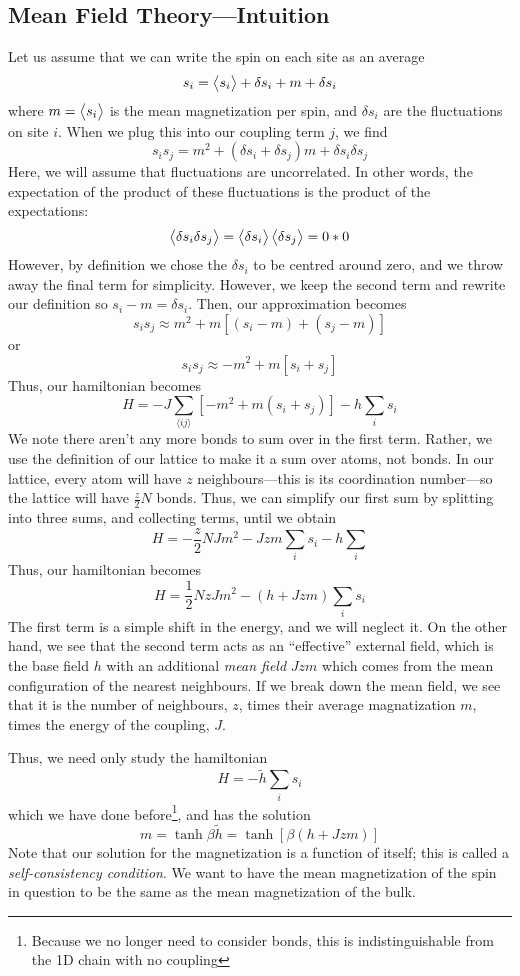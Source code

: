 \subsection{Mean Field Theory---Intuition}
Let us assume that we can write the spin on each site as an average
\[s_i = \left\langle \begin{matrix}s_i\end{matrix} \right\rangle+\delta s_i + m+\delta s_i\]
where \(m=\left\langle \begin{matrix}s_i\end{matrix} \right\rangle\) is the mean magnetization per spin, and \(\delta s_i\) are the fluctuations on site \(i\). When we plug this into our coupling term \(j\), we find
\[s_is_j = m^2 + (\delta s_i+\delta s_j)m + \delta s_i \delta s_j\]
Here, we will assume that fluctuations are uncorrelated. In other words, the expectation of the product of these fluctuations is the product of the expectations:
\[\left\langle \begin{matrix}\delta s_i\delta s_j\end{matrix} \right\rangle= \left\langle \begin{matrix}\delta s_i\end{matrix} \right\rangle\left\langle \begin{matrix}\delta s_j\end{matrix} \right\rangle = 0*0\]
However, by definition we chose the \(\delta s_i\) to be centred around zero, and we throw away the final term for simplicity. However, we keep the second term and rewrite our definition so \(s_i-m = \delta s_i\). Then, our approximation becomes
\[s_i s_j\approx m^2 + m[(s_i-m)+(s_j-m)]\]
or
\begin{equation}
	s_i s_j \approx -m^2+m[s_i+s_j]
\end{equation}
Thus, our hamiltonian becomes
\[H = -J\sum_{\langle i j \rangle}\left[-m^2+m(s_i+s_j)\right]-h\sum_i s_i\]
We note there aren't any more bonds to sum over in the first term. Rather, we use the definition of our lattice to make it a sum over atoms, not bonds. In our lattice, every atom will have \(z\) neighbours---this is its coordination number---so the lattice will have \(\frac{z}{2}N\) bonds. 
Thus, we can simplify our first sum by splitting into three sums, and collecting terms, until we obtain
\[H = -\frac{z}{2}NJ m^2-Jzm\sum_i s_i -h\sum_i\]
Thus, our hamiltonian becomes
\begin{equation}
	H=\frac{1}{2}NzJm^2-(h+Jzm)\sum_i s_i
\end{equation}
The first term is a simple shift in the energy, and we will neglect it. On the other hand, we see that the second term acts as an ``effective'' external field, which is the base field \(h\) with an additional \emph{mean field} \(Jzm\) which comes from the mean configuration of the nearest neighbours. If we break down the mean field, we see that it is the number of neighbours, \(z\), times their average magnatization \(m\), times the energy of the coupling, \(J\).

Thus, we need only study the hamiltonian
\[H = -\tilde h\sum_i s_i\]
which we have done before\footnote{Because we no longer need to consider bonds, this is indistinguishable from the 1D chain with no coupling}, and has the solution
\[m = \tanh \beta\tilde h = \tanh[\beta(h+Jzm)]\]
Note that our solution for the magnetization is a function of itself; this is called a \emph{self-consistency condition}. We want to have the mean magnetization of the spin in question to be the same as the mean magnetization of the bulk.

